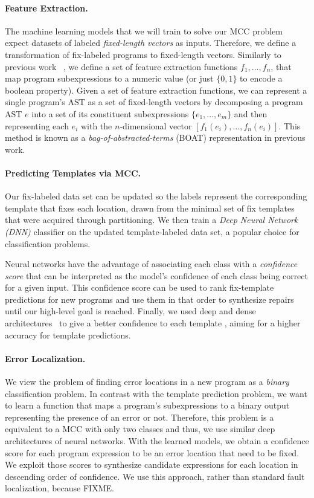 \paragraph{Feature Extraction.} The machine learning models that we will train to
solve our MCC problem expect datasets of labeled \emph{fixed-length vectors} as
inputs. Therefore, we define a transformation of fix-labeled programs to
fixed-length vectors. Similarly to previous work ~\citep{Seidel:2017}, we define
a set of feature extraction functions $f_1, \ldots, f_n$, that map program
subexpressions to a numeric value (or just $\{0, 1\}$ to encode a boolean
property). Given a set of feature extraction functions, we can represent a
single program's AST as a set of fixed-length vectors by decomposing a program
AST $e$ into a set of its constituent subexpressions $\{e_1, \ldots, e_m\}$ and
then representing each $e_i$ with the $n$-dimensional vector $[f_1(e_i), \ldots,
f_n(e_i)]$. This method is known as a \emph{bag-of-abstracted-terms} (BOAT)
representation in previous work.

\paragraph{Predicting Templates via MCC.}
Our fix-labeled data set can be updated so the labels represent the
corresponding template that fixes each location, drawn from the minimal set of
fix templates that were acquired through partitioning. We then train a
\emph{Deep Neural Network (DNN)} classifier on the updated template-labeled data
set, a popular choice for classification problems.

Neural networks have the advantage of associating each class with a
\emph{confidence score} that can be interpreted as the model's confidence of
each class being correct for a given input. This confidence score can be
used to rank fix-template predictions for new programs and use them in that
order to synthesize repairs until our high-level goal is reached. Finally, we
used deep and dense architectures~\cite{FIXME} to give a better confidence
to each template
,
aiming for a higher accuracy for template predictions.

\paragraph{Error Localization.} We view the problem of finding error locations in a
new program as a \emph{binary} classification problem. In contrast with the
template prediction problem, we want to learn a function that maps a program's
subexpressions to a binary output representing the presence of an error or not.
Therefore, this problem is a equivalent to a MCC with only two classes and thus,
we use similar deep architectures of neural networks. With the learned models, we
obtain a confidence score for each program expression to be an error location
that need to be fixed. We exploit those scores to synthesize candidate
expressions for each location in descending order of confidence. We use
this approach, rather than standard fault localization, because FIXME.

